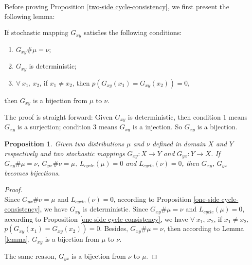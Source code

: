 \documentclass[runningheads]{llncs}
\newtheorem{prop}{Proposition}
\begin{document}
Before proving Proposition \ref{two-side cycle-consistency}, we first present the following lemma: 
\begin{lemma}
	\label{lemma}
	If stochastic mapping $G_{xy}$ satisfies the following conditions:
	\begin{enumerate}
		\item $G_{xy}\#\mu = \nu$;
		\item $G_{xy}$ is deterministic;
		\item $\forall ~ x_1$, $x_2$, if $x_1 \neq x_2$, then $p(G_{xy}(x_1)=G_{xy}(x_2))=0$,
	\end{enumerate}
	then $G_{xy}$ is a bijection from $\mu$ to $\nu$.
\end{lemma}

The proof is straight forward: Given $G_{xy}$ is deterministic, then condition 1 means $G_{xy}$ is a surjection; condition 3 means $G_{xy}$ is a injection. So $G_{xy}$ is a bijection. 

\begin{prop}
	\label{two-side cycle-consistency_appendix}
	Given two distributions $\mu$ and $\nu$ defined in domain $X$ and $Y$ respectively and two stochastic mappings $G_{xy}: X \rightarrow Y$ and $G_{yx}: Y \rightarrow X$. If $G_{xy}\#\mu = \nu$, $G_{yx}\#\nu = \mu$, $L_{cycle}(\mu)=0$ and $L_{cycle}(\nu)=0$, then $G_{xy}$, $G_{yx}$ becomes bijections.
\end{prop}

\begin{proof} $ $ \\
	\indent
	Since $G_{yx}\#\nu = \mu$ and $L_{cycle}(\nu)=0$, according to Proposition \ref{one-side cycle-consistency}, we have $G_{xy}$ is deterministic. Since $G_{xy}\#\mu = \nu$ and $L_{cycle}(\mu)=0$, according to Proposition \ref{one-side cycle-consistency}, we have $\forall ~ x_1$, $x_2$, if $x_1 \neq x_2$, $p(G_{xy}(x_1)=G_{xy}(x_2))=0$. Besides, $G_{xy}\#\mu = \nu$, then according to Lemma \ref{lemma}, $G_{xy}$ is a bijection from $\mu$ to $\nu$. 
	
	The same reason, $G_{yx}$ is a bijection from $\nu$ to $\mu$. 
\end{proof}
\end{document}
